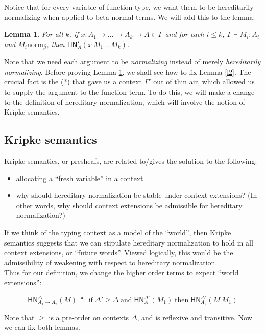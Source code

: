 \documentclass{article}
\newtheorem{lem}[thm]{Lemma}
\newcommand{\hasEF}[3]{\ensuremath{#1 \vdash #2 : #3}}
\newcommand{\bnorm}[1]{\ensuremath{#1 \mathrel{\text{norm}_\beta}}}
\newcommand{\hnorm}[3]{\ensuremath{\mathsf{HN}^{#1}_{#2}(#3)}}
\newcommand{\fn}[2]{\ensuremath{#1 \to #2}}
\newcommand{\ap}[2]{\ensuremath{#1\ #2}}
\begin{document}
Notice that for every variable of function type, we want them to be hereditarily normalizing when applied to 
beta-normal terms. We will add this to the lemma:

\begin{lem}\label{l4}
For all $k$, if $x : A_1 \to \dots \to A_k \to A \in \Gamma$ and for each $i \le k$, $\hasEF{\Gamma}{M_i}{A_i}$ and $\bnorm{M_i}$, then $\hnorm{\Gamma}{A}{\ap{\ap{x}{M_1}}{\dots M_k}}$.
\end{lem}

Note that we need each argument to be \emph{normalizing} instead of merely \emph{hereditarily normalizing}. 
Before proving Lemma \ref{l4}, we shall see how to fix Lemma \ref{l2}. The crucial fact is the (*) that gave us a
context $\Gamma'$
out of thin air, which allowed us to supply the argument to the function term. To do this, we will make a change to 
the definition of hereditary normalization, which will involve the notion of Kripke semantics.

\subsection{Kripke semantics}

Kripke semantics, or presheafs, are related to/gives the solution to the following:
\begin{itemize}
\item allocating a ``fresh variable'' in a context
\item why should hereditary normalization be stable under context extensions? (In other words, why should context
extensions be admissible for hereditary normalization?)
\end{itemize}

If we think of the typing context as a model of the ``world'', then Kripke semantics suggests that we can stipulate
hereditary normalization to hold in all context extensions, or ``future words''. Viewed logically, this would be the
admissibility of weakening with respect to hereditary normalization.\\

Thus for our definition, we change the higher order terms to expect ``world extensions'':

\[
\hnorm{\Delta}{\fn{A_1}{A_2}}{M} \triangleq \;\text{if}\; \Delta' \ge \Delta \;\text{and}\; \hnorm{\Delta'}{A_1}{M_1}
\;\text{then}\; \hnorm{\Delta'}{A_2}{\ap{M}{M_1}}
\]

Note that $\ge$ is a pre-order on contexts $\Delta$, and is reflexive and transitive. Now we can fix both lemmas. 
\end{document}
